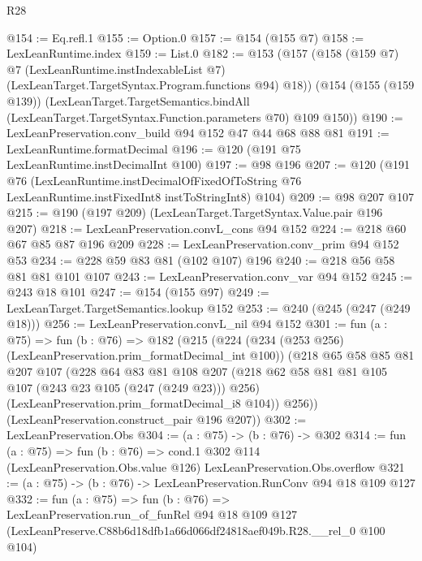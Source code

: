 \begin{lexlean}{R28}
\begin{coremodule}
@154 := Eq.refl.{1}
@155 := Option.{0}
@157 := @154 (@155 @7)
@158 := LexLeanRuntime.index
@159 := List.{0}
@182 := @153
    (@157
      (@158
        (@159 @7)
        @7
        (LexLeanRuntime.instIndexableList @7)
        (LexLeanTarget.TargetSyntax.Program.functions @94)
        @18))
    (@154
      (@155 (@159 @139))
      (LexLeanTarget.TargetSemantics.bindAll
        (LexLeanTarget.TargetSyntax.Function.parameters @70)
        @109
        @150))
@190 := LexLeanPreservation.conv_build @94 @152 @47 @44 @68 @88 @81
@191 := LexLeanRuntime.formatDecimal
@196 := @120 (@191 @75 LexLeanRuntime.instDecimalInt @100)
@197 := @98 @196
@207 := @120
    (@191
      @76
      (LexLeanRuntime.instDecimalOfFixedOfToString
        @76
        LexLeanRuntime.instFixedInt8
        instToStringInt8)
      @104)
@209 := @98 @207 @107
@215 := @190 (@197 @209) (LexLeanTarget.TargetSyntax.Value.pair @196 @207)
@218 := LexLeanPreservation.convL_cons @94 @152
@224 := @218 @60 @67 @85 @87 @196 @209
@228 := LexLeanPreservation.conv_prim @94 @152 @53
@234 := @228 @59 @83 @81 (@102 @107) @196
@240 := @218 @56 @58 @81 @81 @101 @107
@243 := LexLeanPreservation.conv_var @94 @152
@245 := @243 @18 @101
@247 := @154 (@155 @97)
@249 := LexLeanTarget.TargetSemantics.lookup @152
@253 := @240 (@245 (@247 (@249 @18)))
@256 := LexLeanPreservation.convL_nil @94 @152
@301 := fun (a : @75) =>
  fun (b : @76) =>
  @182
    (@215
      (@224
        (@234 (@253 @256) (LexLeanPreservation.prim_formatDecimal_int @100))
        (@218
          @65
          @58
          @85
          @81
          @207
          @107
          (@228
            @64
            @83
            @81
            @108
            @207
            (@218 @62 @58 @81 @81 @105 @107 (@243 @23 @105 (@247 (@249 @23))) @256)
            (LexLeanPreservation.prim_formatDecimal_i8 @104))
          @256))
      (LexLeanPreservation.construct_pair @196 @207))
@302 := LexLeanPreservation.Obs
@304 := (a : @75) -> (b : @76) -> @302
@314 := fun (a : @75) =>
  fun (b : @76) =>
  cond.{1} @302 @114 (LexLeanPreservation.Obs.value @126) LexLeanPreservation.Obs.overflow
@321 := (a : @75) -> (b : @76) -> LexLeanPreservation.RunConv @94 @18 @109 @127
@332 := fun (a : @75) =>
  fun (b : @76) =>
  LexLeanPreservation.run_of_funRel
    @94
    @18
    @109
    @127
    (LexLeanPreserve.C88b6d18dfb1a66d066df24818aef049b.R28.__rel_0 @100 @104)
\end{coremodule}
\end{lexlean}
